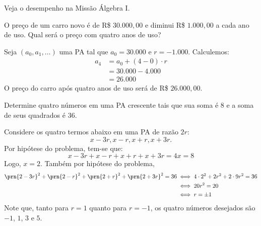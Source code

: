 \begin{onlineact}
\end{onlineact}

\begin{onlineact}
\end{onlineact}
%
\noindent Veja o desempenho na Missão Álgebra I.

\begin{example} 
O preço de um carro novo é de R\$ $30.000{,}00$ e diminui R\$ $1.000{,}00$ a cada ano de uso. Qual será o preço com quatro anos de uso?
\end{example}

\begin{solution}
Seja $(a_0, a_1, \dots)$ uma PA tal que $a_0 = 30.000$ e $r = -1.000$. Calculemos:
%
\begin{align*}
a_4 &= a_0+(4-0)\cdot r\\ &=30.000-4.000 \\ &= 26.000
\end{align*}
%
O preço do carro após quatro anos de uso será de R\$ $26.000{,}00$.
\end{solution}

\begin{example}
Determine quatro números em uma PA crescente tais que sua soma é 8 e a soma de seus quadrados é 36.
\end{example}

\begin{solution}
Considere os quatro termos abaixo em uma PA de razão $2r$:
%
\begin{equation*}
x-3r, x-r, x+r, x+3r.
\end{equation*}
%
Por hipótese do problema, tem-se que:
%
\begin{equation*}
x-3r+x-r+x+r+x+3r = 4x = 8 
\end{equation*}
%
Logo, $x=2$. Também por hipótese do problema, 
%
\begin{align*}
\prn{2-3r}^2 + \prn{2-r}^2 + \prn{2+r}^2 + \prn{2+3r}^2 = 36 & \iff 4 \cdot 2^2 + 2r^2 + 2\cdot 9r^2 =  36 \\ & \iff 20r^2 = 20 \\ & \iff r = \pm 1
\end{align*}
%
Note que, tanto para $r=1$ quanto para $r=-1$, os quatro números desejados são $-1$, $1$, $3$ e $5$.
\end{solution}

